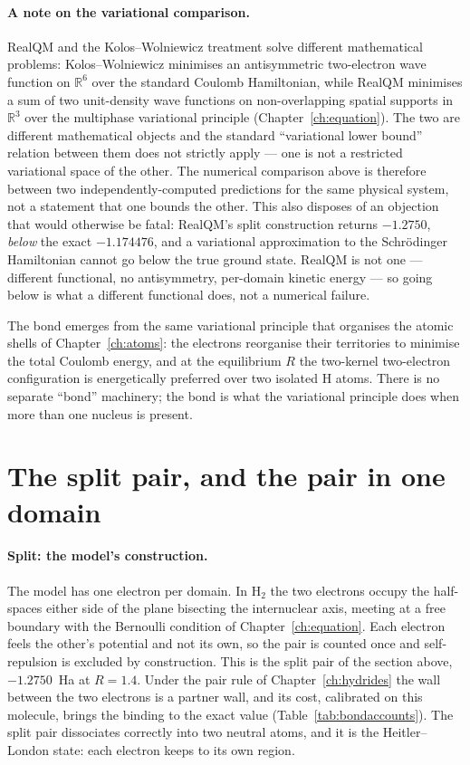 \paragraph{A note on the variational comparison.}
RealQM and the Kolos--Wolniewicz treatment solve different mathematical problems: Kolos--Wolniewicz minimises an antisymmetric two-electron wave function on $\mathbb{R}^6$ over the standard Coulomb Hamiltonian, while RealQM minimises a sum of two unit-density wave functions on non-overlapping spatial supports in $\mathbb{R}^3$ over the multiphase variational principle (Chapter~\ref{ch:equation}). The two are different mathematical objects and the standard ``variational lower bound'' relation between them does not strictly apply --- one is not a restricted variational space of the other. The numerical comparison above is therefore between two independently-computed predictions for the same physical system, not a statement that one bounds the other. This also disposes of an objection that would otherwise be fatal: RealQM's split construction returns $-1.2750$, \emph{below} the exact $-1.174476$, and a variational approximation to the Schr\"odinger Hamiltonian cannot go below the true ground state. RealQM is not one --- different functional, no antisymmetry, per-domain kinetic energy --- so going below is what a different functional does, not a numerical failure.

The bond emerges from the same variational principle that organises the atomic shells of Chapter~\ref{ch:atoms}: the electrons reorganise their territories to minimise the total Coulomb energy, and at the equilibrium $R$ the two-kernel two-electron configuration is energetically preferred over two isolated H atoms. There is no separate ``bond'' machinery; the bond is what the variational principle does when more than one nucleus is present.

\section{The split pair, and the pair in one domain}\label{sec:h2-bracket}

\paragraph{Split: the model's construction.} The model has one electron per domain. In H$_2$ the two
electrons occupy the half-spaces either side of the plane bisecting the internuclear axis, meeting at
a free boundary with the Bernoulli condition of Chapter~\ref{ch:equation}. Each electron feels the
other's potential and not its own, so the pair is counted once and self-repulsion is excluded by
construction. This is the split pair of the section above, $-1.2750$~Ha at $R=1.4$. Under the pair
rule of Chapter~\ref{ch:hydrides} the wall between the two electrons is a partner wall, and its cost,
calibrated on this molecule, brings the binding to the exact value (Table~\ref{tab:bondaccounts}). The
split pair dissociates correctly into two neutral atoms, and it is the Heitler--London state: each
electron keeps to its own region.

